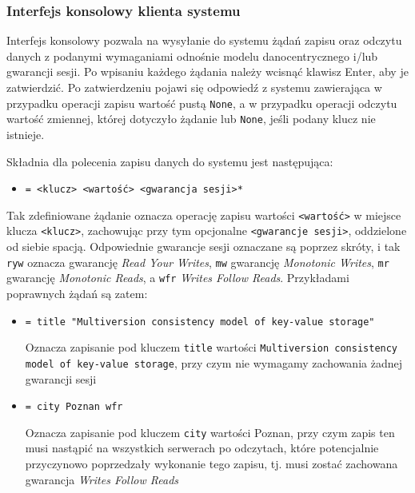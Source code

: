 \subsubsection{Interfejs konsolowy klienta systemu} \label{subsubsection:console_interface}

Interfejs konsolowy pozwala na wysyłanie do systemu żądań zapisu oraz odczytu danych z podanymi wymaganiami odnośnie modelu danocentrycznego i/lub gwarancji sesji. Po wpisaniu każdego żądania należy wcisnąć klawisz Enter, aby je zatwierdzić. Po zatwierdzeniu pojawi się odpowiedź z systemu zawierająca w przypadku operacji zapisu wartość pustą \texttt{None}, a w przypadku operacji odczytu wartość zmiennej, której dotyczyło żądanie lub \texttt{None}, jeśli podany klucz nie istnieje.

Składnia dla polecenia zapisu danych do systemu jest następująca:

\begin{itemize}[label={}]
    \item \texttt{= <klucz> <wartość> <gwarancja sesji>*}
\end{itemize}

Tak zdefiniowane żądanie oznacza operację zapisu wartości \texttt{<wartość>} w miejsce klucza \texttt{<klucz>}, zachowując przy tym opcjonalne \texttt{<gwarancje sesji>}, oddzielone od siebie spacją. Odpowiednie gwarancje sesji oznaczane są poprzez skróty, i tak \texttt{ryw} oznacza gwarancję \textit{Read Your Writes}, \texttt{mw} gwarancję \textit{Monotonic Writes}, \texttt{mr} gwarancję \textit{Monotonic Reads}, a \texttt{wfr} \textit{Writes Follow Reads}. Przykładami poprawnych żądań są zatem:

\begin{itemize}[label={}]
    \item \texttt{= title "Multiversion consistency model of key-value storage"}
    
    Oznacza zapisanie pod kluczem \texttt{title} wartości \texttt{Multiversion consistency model of key-value storage}, przy czym nie wymagamy zachowania żadnej gwarancji sesji
    
    \item \texttt{= city Poznan wfr}
    
    Oznacza zapisanie pod kluczem \texttt{city} wartości Poznan, przy czym zapis ten musi nastąpić na wszystkich serwerach po odczytach, które potencjalnie przyczynowo poprzedzały wykonanie tego zapisu, tj. musi zostać zachowana gwarancja \textit{Writes Follow Reads}
\end{itemize}

